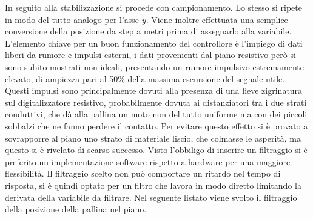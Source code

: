 \documentclass[12pt,twoside,openright]{article}
\begin{document}
In seguito alla stabilizzazione si procede con campionamento. Lo stesso si ripete in modo del tutto analogo per l'asse $y$. Viene inoltre effettuata una semplice conversione della posizione da step a metri prima di assegnarlo alla variabile. L'elemento chiave per un buon funzionamento del controllore è l'impiego di dati liberi da rumore e impulsi esterni, i dati provenienti dal piano resistivo però si sono subito mostrati non ideali, presentando un rumore impulsivo estremamente elevato, di ampiezza pari al 50\% della massima escursione del segnale utile. Questi impulsi sono principalmente dovuti alla presenza di una lieve zigrinatura sul digitalizzatore resistivo, probabilmente dovuta ai distanziatori tra i due strati conduttivi, che dà alla pallina un moto non del tutto uniforme ma con dei piccoli sobbalzi che ne fanno perdere il contatto. Per evitare questo effetto si è provato a sovrapporre al piano uno strato di materiale liscio, che colmasse le asperità, ma questo si è rivelato di scarso successo. Visto l'obbiligo di inserire un filtraggio si è preferito un implementazione software rispetto a hardware per una maggiore flessibilità. Il filtraggio scelto non può comportare un ritardo nel tempo di risposta, si è quindi optato per un filtro che lavora in modo diretto limitando la derivata della variabile da filtrare. Nel seguente listato viene svolto il filtraggio della posizione della pallina nel piano.
\end{document}
